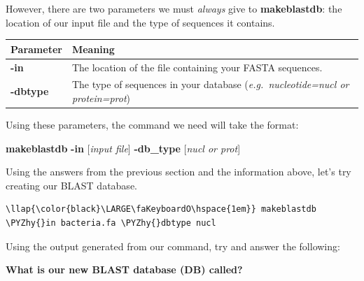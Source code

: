 \documentclass[11pt]{article}
\def\PYZhy{\char`\-}
\begin{document}
However, there are two parameters we must \textit{always} give to
\textbf{makeblastdb}: the location of our input file and the type of
sequences it contains.

\begin{longtable}[]{@{}ll@{}}
\hline
\begin{minipage}[b]{0.47\columnwidth}\raggedright
\textbf{Parameter}\strut
\end{minipage} & \begin{minipage}[b]{0.47\columnwidth}\raggedright
\textbf{Meaning}\strut
\end{minipage}\tabularnewline
\hline
\endhead
\begin{minipage}[t]{0.47\columnwidth}\raggedright
\textbf{-in}\strut
\end{minipage} & \begin{minipage}[t]{0.47\columnwidth}\raggedright
The location of the file containing your FASTA sequences.\strut
\end{minipage}\tabularnewline
\begin{minipage}[t]{0.47\columnwidth}\raggedright
\textbf{-dbtype}\strut
\end{minipage} & \begin{minipage}[t]{0.47\columnwidth}\raggedright
The type of sequences in your database (\textit{e.g.~nucleotide=nucl or
protein=prot})\strut
\end{minipage}\tabularnewline
\hline
\end{longtable}

Using these parameters, the command we need will take the format:

\textbf{makeblastdb} \textbf{-in} {[}\textit{input file}{]}
\textbf{-db\_type} {[}\textit{nucl or prot}{]}

Using the answers from the previous section and the information above,
let's try creating our BLAST database.

\begin{terminalinput}
\begin{Verbatim}[commandchars=\\\{\}]
\llap{\color{black}\LARGE\faKeyboardO\hspace{1em}} makeblastdb \PYZhy{}in bacteria.fa \PYZhy{}dbtype nucl
\end{Verbatim}
\end{terminalinput}

    Using the output generated from our command, try and answer the
following:

\textbf{What is our new BLAST database (DB) called?}
\end{document}
